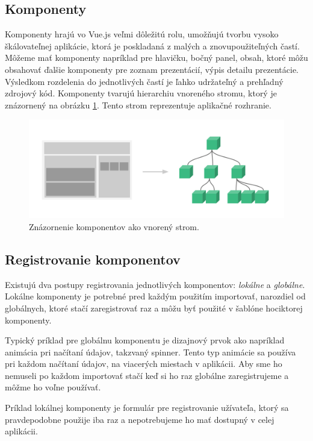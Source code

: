 \subsection*{Komponenty}
Komponenty hrajú vo Vue.js veľmi dôležitú rolu, umožňujú tvorbu vysoko škálovateľnej aplikácie, ktorá je poskladaná z malých a znovupoužiteľných častí. Môžeme mať komponenty napríklad pre hlavičku, bočný panel, obsah, ktoré môžu obsahovať ďalšie komponenty pre zoznam prezentácií, výpis detailu prezentácie. Výsledkom rozdelenia do jednotlivých častí je ľahko udržateľný a prehľadný zdrojový kód. Komponenty tvarujú hierarchiu vnoreného stromu, ktorý je znázornený na obrázku \ref{pic:components}. Tento strom reprezentuje aplikačné rozhranie.
    \begin{figure}[!hbt]
        \centering
        \includegraphics[scale=0.25]{obrazky/components.png}
        \caption{Znázornenie komponentov ako vnorený strom\cite{vue-guide}.}
        \label{pic:components}
    \end{figure}
    
\subsection*{Registrovanie komponentov}
Existujú dva postupy registrovania jednotlivých komponentov: \textit{lokálne} a \textit{globálne}. Lokálne komponenty je potrebné pred každým použitím importovať, narozdiel od globálnych, ktoré stačí zaregistrovať raz a môžu byť použité v šablóne hociktorej komponenty. 

Typický príklad pre globálnu komponentu je dizajnový prvok ako napríklad animácia pri načítaní údajov, takzvaný spinner. Tento typ animácie sa používa pri každom načítaní údajov, na viacerých miestach v aplikácii. Aby sme ho nemuseli po každom importovať stačí keď si ho raz globálne zaregistrujeme a môžme ho voľne používať. 

Príklad lokálnej komponenty je formulár pre registrovanie užívateľa, ktorý sa pravdepodobne použije iba raz a nepotrebujeme ho mať dostupný v celej aplikácii.

